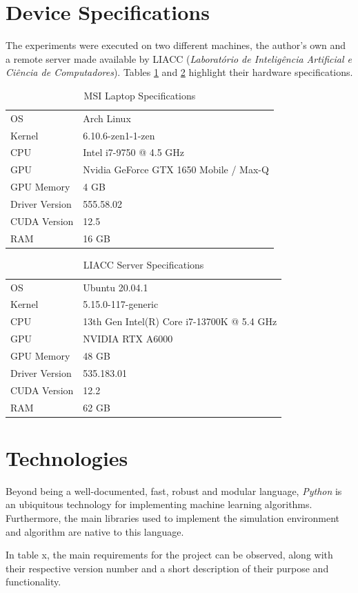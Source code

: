 \section{Device Specifications}

The experiments were executed on two different machines, the author's own and a remote server made available by LIACC (\textit{Laboratório de Inteligência Artificial e Ciência de Computadores}). Tables \ref{tab:specs-msi} and \ref{tab:specs-liacc} highlight their hardware specifications.

\begin{table} 
	\label{tab:specs-msi}
	\begin{tabular}{|l|l|}
		\hline
		OS & Arch Linux \\
		Kernel & 6.10.6-zen1-1-zen \\
		CPU & Intel i7-9750 @ 4.5 GHz \\
		GPU & Nvidia GeForce GTX 1650 Mobile / Max-Q \\
		GPU Memory & 4 GB  \\
		Driver Version & 555.58.02 \\
		CUDA Version & 12.5 \\
		RAM & 16 GB \\
		\hline
\end{tabular}
\caption{MSI Laptop Specifications}
\end{table}

\begin{table} 
	\label{tab:specs-liacc}
	\begin{tabular}{|l|l|}
		\hline
		OS & Ubuntu 20.04.1 \\
		Kernel & 5.15.0-117-generic \\
		CPU & 13th Gen Intel(R) Core i7-13700K @ 5.4 GHz \\
		GPU & NVIDIA RTX A6000 \\
		GPU Memory & 48 GB \\
		Driver Version & 535.183.01 \\
		CUDA Version & 12.2 \\
		RAM & 62 GB \\
		\hline
\end{tabular}
\caption{LIACC Server Specifications}
\end{table}

\section{Technologies}

Beyond being a well-documented, fast, robust and modular language, \textit{Python} is an ubiquitous technology for implementing machine learning algorithms. Furthermore, the main libraries used to implement the simulation environment and algorithm are native to this language. \par
In table x, the main requirements for the project can be observed, along with their respective version number and a short description of their purpose and functionality.
\par

